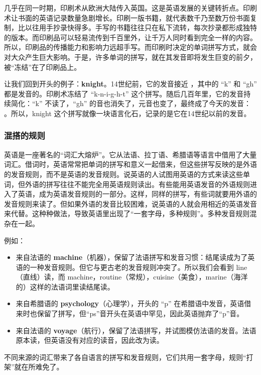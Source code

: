 \documentclass[10.5pt, a4paper]{ctexbook} %
\begin{document}
几乎在同一时期，印刷术从欧洲大陆传入英国。这是英语发展的关键转折点。印刷术让书面的英语记录数量急剧增长。印刷一版书籍，就代表数千乃至数万份书面复制，比以往用手抄录快得多。手写的书籍往往只在私下流转，每次抄录都形成独特的版本。而印刷品可以轻易流传到千百里外，让千万人同时看到完全一样的内容。所以，印刷品的传播能力和影响力远超手写。而印刷时决定的单词拼写方式，就会对大众产生巨大影响。于是，许多单词的拼写，就在其发音即将发生巨变的前夕，被“冻结”在了印刷品上。

让我们回到开头的例子：\textbf{knight}。14世纪前，它的发音接近 ，其中的 “k” 和 “gh” 都是发音的。印刷术冻结了 “k-n-i-g-h-t” 这个拼写。随后几百年里，它的发音持续简化：“k” 不读了，“gh” 的音也消失了，元音也变了，最终成了今天的发音： 。所以，knight 这个拼写就像一块语言化石，记录的是它在14世纪以前的发音。

\subsubsection*{混搭的规则}

英语是一座著名的“词汇大熔炉”。它从法语、拉丁语、希腊语等语言中借用了大量词汇。借词时，英语常常把单词的拼写和意义一起借来，但这些拼写反映的是外语的发音规则，而不是英语的发音规则。说英语的人试图用英语的方式来读这些单词，但外语的拼写往往不能完全用英语规则读出。有些能用英语发音的外语规则进入了英语，成为英语发音规则的一部分。这样，同样的拼写，有些词就要用外语的发音规则来读了。但如果外语的发音比较困难，说英语的人就会用相近的英语发音来代替。这种种做法，导致英语里出现了“一套字母，多种规则”。多种发音规则混杂在一起。

例如：
\begin{itemize}
    \item 来自法语的 \textbf{machine}（机器），保留了法语拼写和发音习惯：结尾读成为了英语的一种发音规则。但它与更古老的发音规则冲突了。所以我们会看到 line（直线）读，而 machine，routine（常规），cuisine（美食），marine（海洋的）这样的法语词里读结尾读。
    \item 来自希腊语的 \textbf{psychology}（心理学），开头的 “p” 在希腊语中发音，英语借来时也保留了拼写，但“ps”音开头在英语中罕见，因此英语抛弃了“p”音。
    \item 来自法语的 \textbf{voyage}（航行），保留了法语拼写，并试图模仿法语的发音。法语原本读，但英语没有对应的读音，因此改为读。
\end{itemize}

不同来源的词汇带来了各自语言的拼写和发音规则，它们共用一套字母，规则“打架”就在所难免了。
\end{document}
